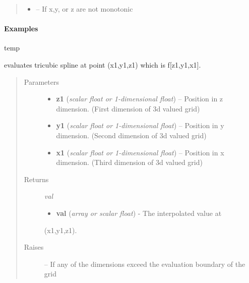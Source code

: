 \documentclass[letterpaper,10pt,english]{sphinxmanual}
\begin{document}
\begin{fulllineitems}
\begin{quote}
\begin{description}
\begin{itemize}
\item {} 
 -- If x,y, or z are not monotonic

\end{itemize}

\end{description}\end{quote}
\paragraph{Examples}

temp

\begin{fulllineitems}
\label{eqtools:eqtools.trispline.Spline.ev}
evaluates tricubic spline at point (x1,y1,z1) which is f{[}z1,y1,x1{]}.
\begin{quote}\begin{description}
\item[{Parameters}] \leavevmode\begin{itemize}
\item {} 
\textbf{z1} (\emph{scalar float or 1-dimensional float}) -- Position in z dimension. (First dimension of 3d valued grid)

\item {} 
\textbf{y1} (\emph{scalar float or 1-dimensional float}) -- Position in y dimension. (Second dimension of 3d valued grid)

\item {} 
\textbf{x1} (\emph{scalar float or 1-dimensional float}) -- Position in x dimension. (Third dimension of 3d valued grid)

\end{itemize}

\item[{Returns}] \leavevmode

\emph{val}
\begin{itemize}
\item {} 
\textbf{val} (\emph{array or scalar float}) - The interpolated value at

\end{itemize}

(x1,y1,z1).


\item[{Raises}] \leavevmode
{} -- If any of the dimensions exceed the evaluation boundary
of the grid

\end{description}\end{quote}

\end{fulllineitems}
\end{fulllineitems}
\end{document}
